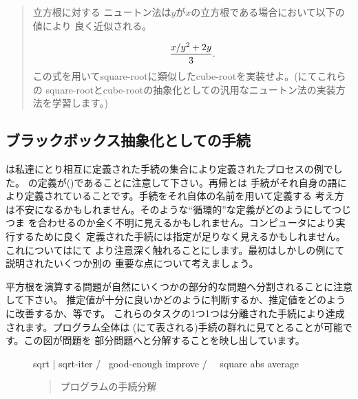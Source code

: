 \begin{quote}
 立方根に対する
ニュートン法は\( y \)が\( x \)の立方根である場合において以下の値により
良く近似される。
\begin{comment}

\begin{example}
x/y^2 + 2y
----------
    3
\end{example}

\end{comment}
\begin{displaymath}
{{x / y^2} + 2y\over 3}.
\end{displaymath}
\noindent
この式を用いてsquare-rootに類似したcube-rootを実装せよ。(にてこれらの
square-rootとcube-rootの抽象化としての汎用なニュートン法の実装方法を学習します。)
\end{quote}

\subsection{ブラックボックス抽象化としての手続}
\label{Section 1.1.8}



は私達にとり相互に定義された手続の集合により定義されたプロセスの例でした。
の定義が()であることに注意して下さい。再帰とは
手続がそれ自身の語により定義されていることです。手続をそれ自体の名前を用いて定義する
考え方は不安になるかもしれません。そのような``循環的''な定義がどのようにしてつじつま
を合わせるのか全く不明に見えるかもしれません。コンピュータにより実行するために良く
定義された手続には指定が足りなく見えるかもしれません。これについてはにて
より注意深く触れることにします。最初はしかしの例にて説明されたいくつか別の
重要な点について考えましょう。



平方根を演算する問題が自然にいくつかの部分的な問題へ分割されることに注意して下さい。
推定値が十分に良いかどのように判断するか、推定値をどのように改善するか、等です。
これらのタスクの1つ1つは分離された手続により達成されます。プログラム全体は
(にて表される)手続の群れに見てとることが可能です。この図が問題を
部分問題へと分解することを映し出しています。

\begin{figure}[tb]
\label{Figure 1.2}
\centering
\begin{comment}
\heading{Figure 1.2:} Procedural decomposition of the \code{sqrt} program.
\end{comment}
\begin{example}
                       sqrt
                        |
                    sqrt-iter
                    /       \
            good-enough    improve
              /     \          \
          square    abs      average
\end{example}

\begin{quote}
 プログラムの手続分解
\end{quote}
\end{figure}

